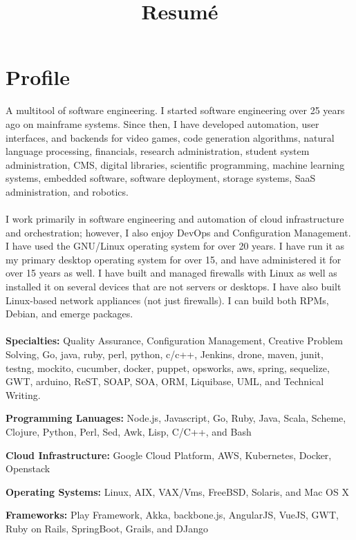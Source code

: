 \documentclass[11pt,a4paper,sans]{moderncv}        %
\title{Resumé}                               %
\begin{document}
\makecvtitle
\section{Profile}
\indent A multitool of software engineering. I started software engineering over 25 years 
ago on mainframe systems. Since then, I have developed automation, user interfaces, and 
backends for video games, code generation algorithms, natural language 
processing, financials, research administration, student system administration, 
CMS, digital libraries, scientific programming, machine learning systems, embedded software, 
software deployment, storage systems, SaaS administration, and robotics.
\\\\
\indent I work primarily in software engineering and automation of cloud infrastructure
and orchestration; however, I also enjoy DevOps and Configuration Management. 
I have used the GNU/Linux operating system for over 20 years. I have run it as my 
primary desktop operating system for over 15, and have administered it for over 15 
years as well. I have built and managed firewalls with Linux as well as installed 
it on several devices that are not servers or desktops. I have also built Linux-based 
network appliances (not just firewalls). I can build both RPMs, Debian, and emerge 
packages. 
\\\\
\textbf{Specialties:} Quality Assurance, Configuration Management, Creative Problem 
Solving, Go, java, ruby, perl, python, c/c++, Jenkins, drone, maven, junit, 
testng, mockito, cucumber, docker, puppet, opsworks, aws, spring, sequelize, 
GWT, arduino, ReST, SOAP, SOA, ORM, Liquibase, UML, and Technical Writing.

\textbf{Programming Lanuages:} Node.js, Javascript, Go, Ruby, Java, Scala, Scheme, 
Clojure, Python, Perl, Sed, Awk, Lisp, C/C++, and Bash

\textbf{Cloud Infrastructure:} Google Cloud Platform, AWS, Kubernetes, Docker, Openstack

\textbf{Operating Systems:} Linux, AIX, VAX/Vms, FreeBSD, Solaris, and Mac OS X

\textbf{Frameworks:} Play Framework, Akka, backbone.js, AngularJS, VueJS, GWT, Ruby on Rails, 
SpringBoot, Grails, and DJango
\end{document}
